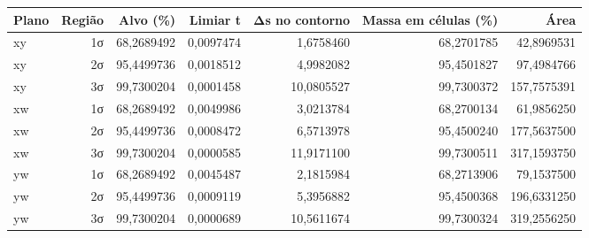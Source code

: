 \begin{tabular}{lrrrrrr}
\toprule
Plano & Região & Alvo (\%) & Limiar t & Δs no contorno & Massa em células (\%) & Área \\
\midrule
xy & 1σ & 68,2689492 & 0,0097474 & 1,6758460 & 68,2701785 & 42,8969531 \\
xy & 2σ & 95,4499736 & 0,0018512 & 4,9982082 & 95,4501827 & 97,4984766 \\
xy & 3σ & 99,7300204 & 0,0001458 & 10,0805527 & 99,7300372 & 157,7575391 \\
xw & 1σ & 68,2689492 & 0,0049986 & 3,0213784 & 68,2700134 & 61,9856250 \\
xw & 2σ & 95,4499736 & 0,0008472 & 6,5713978 & 95,4500240 & 177,5637500 \\
xw & 3σ & 99,7300204 & 0,0000585 & 11,9171100 & 99,7300511 & 317,1593750 \\
yw & 1σ & 68,2689492 & 0,0045487 & 2,1815984 & 68,2713906 & 79,1537500 \\
yw & 2σ & 95,4499736 & 0,0009119 & 5,3956882 & 95,4500368 & 196,6331250 \\
yw & 3σ & 99,7300204 & 0,0000689 & 10,5611674 & 99,7300324 & 319,2556250 \\
\bottomrule
\end{tabular}
